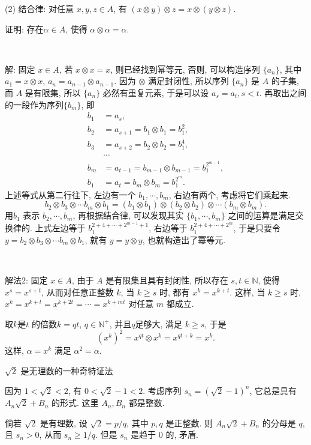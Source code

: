 (2) 结合律: 对任意 $x,y,z\in A$, 有 $(x\otimes y)\otimes z = x\otimes(y\otimes z)$.

证明: 存在$\alpha\in A$, 使得 $\alpha\otimes\alpha=\alpha$.


~

解: 固定 $x\in A$, 若 $x\otimes x = x$, 则已经找到幂等元, 否则, 可以构造序列 $\{a_n\}$, 其中 $a_1=x\otimes x$, $a_{n}=a_{n-1}\otimes a_{n-1}$. 因为 $\otimes$ 满足封闭性, 所以序列 $\{a_n\}$ 是 $A$ 的子集, 而 $A$  是有限集, 所以 $\{a_n\}$ 必然有重复元素, 于是可以设 $a_s = a_t, s<t$. 再取出之间的一段作为序列$\{b_m\}$, 即
\begin{align*}
b_1&=a_s,\\ 
b_2&=a_{s+1}=b_1\otimes b_1 = b_1^2,\\ 
b_3&=a_{s+2}=b_2\otimes b_2 = b_1^4,\\
&\cdots\\ 
b_m&=a_{t-1} = b_{m-1}\otimes b_{m-1} = b_1^{2^{m-1}},\\
b_1&=a_t=b_{m}\otimes b_m=b_1^{2^m}.
\end{align*}
上述等式从第二行往下, 左边有一个 $b_1, \cdots, b_m$, 右边有两个, 考虑将它们乘起来.
\[b_2\otimes b_3\otimes\cdots b_m\otimes b_1 = (b_1\otimes b_1)\otimes(b_2\otimes b_2)\otimes\cdots(b_m\otimes b_m).\]
用$b_1$ 表示 $b_2,\cdots,b_m$, 再根据结合律, 可以发现其实 $\{b_1, \cdots, b_m\}$ 之间的运算是满足交换律的. 上式左边等于 $b_1^{2+4+\cdots+2^{m-1}+1}$, 右边等于 $b_1^{2+4+\cdots+2^m}$, 于是只要令 $y=b_2\otimes b_3\otimes\cdots b_m\otimes b_1$, 就有 $y=y\otimes y$, 也就构造出了幂等元.

~

解法2: 固定 $x\in A$, 由于 $A$ 是有限集且具有封闭性, 所以存在 $s,t\in\mathbb{N}$, 使得 $x^s = x^{s+t}$, 从而对任意正整数 $k$, 当 $k\ge s$ 时, 都有 $x^k=x^{k+t}$. 这样, 当 $k\ge s$ 时, $x^k=x^{k+t}=x^{k+2t}=\cdots=x^{k+mt}$ 对任意 $m$ 都成立.

取$k$是$t$ 的倍数$k=qt$, $q\in\mathbb{N}^+$, 并且$q$足够大, 满足 $k\ge s$, 于是
\[ (x^k)^2 = x^{qt}\otimes x^k=x^{qt+k}=x^k .\]
这样, $\alpha=x^k$ 满足 $\alpha^2=\alpha$.

\newpage
\noindent $\sqrt{2}$ 是无理数的一种奇特证法

因为 $1<\sqrt{2}<2$, 有 $0<\sqrt{2}-1<2$. 考虑序列 $s_n = (\sqrt{2}-1)^n$, 它总是具有 $A_n\sqrt{2}+B_n$ 的形式. 这里 $A_n, B_n$ 都是整数.

倘若 $\sqrt{2}$ 是有理数, 设 $\sqrt{2} = p/q$, 其中 $p,q$ 是正整数. 则 $A_n\sqrt{2}+B_n$ 的分母是 $q$, 且 $s_n>0$, 从而 $s_n \ge 1/q$. 但是 $s_n$ 是趋于 0 的, 矛盾.

